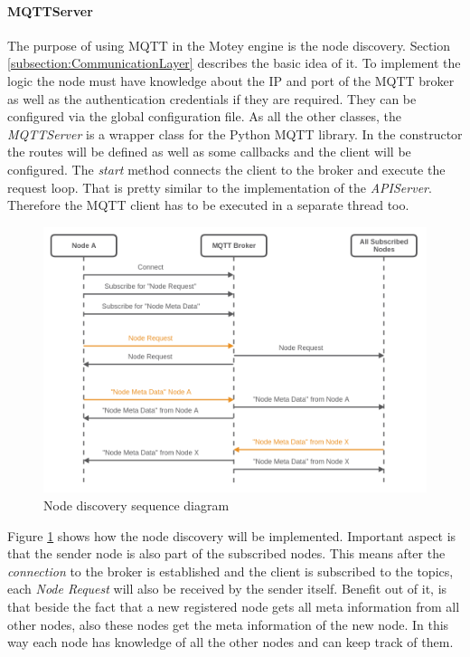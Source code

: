 \paragraph{MQTTServer}
The purpose of using \ac{MQTT} in the Motey engine is the node discovery.
Section \ref{subsection:CommunicationLayer} describes the basic idea of it.
To implement the logic the node must have knowledge about the \ac{IP} and port of the \ac{MQTT} broker as well as the authentication credentials if they are required.
They can be configured via the global configuration file.
As all the other classes, the \textit{MQTTServer} is a wrapper class for the Python \ac{MQTT} library.
In the constructor the routes will be defined as well as some callbacks and the client will be configured.
The \textit{start} method connects the client to the broker and execute the request loop.
That is pretty similar to the implementation of the \textit{APIServer}.
Therefore the \ac{MQTT} client has to be executed in a separate thread too.\newline

\begin{figure}[H]
    \centering
    \includegraphics[width=\textwidth]{resources/images/node_discovery.png}
    \caption[Node discovery sequence diagram]{Node discovery sequence diagram}
    \label{fig:node_discovery_squ_dia}
\end{figure}

Figure \ref{fig:node_discovery_squ_dia} shows how the node discovery will be implemented.
Important aspect is that the sender node is also part of the subscribed nodes.
This means after the \textit{connection} to the broker is established and the client is subscribed to the topics, each \textit{Node Request} will also be received by the sender itself.
Benefit out of it, is that beside the fact that a new registered node gets all meta information from all other nodes, also these nodes get the meta information of the new node.
In this way each node has knowledge of all the other nodes and can keep track of them.\newline

